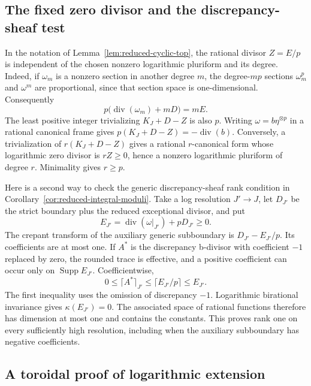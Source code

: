\subsection{The fixed zero divisor and the discrepancy-sheaf test}

In the notation of Lemma~\ref{lem:reduced-cyclic-top}, the rational
divisor $Z=E/p$ is independent of the chosen nonzero logarithmic
pluriform and its degree. Indeed, if $\omega_m$ is a nonzero section
in another degree $m$, the degree-$mp$ sections $\omega_m^p$ and
$\omega^m$ are proportional, since that section space is
one-dimensional. Consequently
\[
 p\bigl(\operatorname{div}(\omega_m)+mD\bigr)=mE.
\]
The least positive integer trivializing $K_J+D-Z$ is also $p$.
Writing $\omega=b\eta^{\otimes p}$ in a rational canonical frame
gives $p(K_J+D-Z)=-\operatorname{div}(b)$. Conversely, a
trivialization of $r(K_J+D-Z)$ gives a rational $r$-canonical form
whose logarithmic zero divisor is $rZ\ge0$, hence a nonzero
logarithmic pluriform of degree $r$. Minimality gives $r\ge p$.

Here is a second way to check the generic discrepancy-sheaf rank
condition in Corollary~\ref{cor:reduced-integral-moduli}. Take a log
resolution $J'\to J$, let $D_{J'}$ be the strict boundary plus the
reduced exceptional divisor, and put
\[
 E_{J'}=\operatorname{div}(\omega|_{J'})+pD_{J'}\ge0.
\]
The crepant transform of the auxiliary generic subboundary is
$D_{J'}-E_{J'}/p$. Its coefficients are at most one. If $A^*$ is
the discrepancy b-divisor with coefficient $-1$ replaced by zero,
the rounded trace is effective, and a positive coefficient can
occur only on $\operatorname{Supp}E_{J'}$. Coefficientwise,
\[
 0\le \lceil A^*\rceil_{J'}
   \le\lceil E_{J'}/p\rceil\le E_{J'}.
\]
The first inequality uses the omission of discrepancy $-1$.
Logarithmic birational invariance gives $\kappa(E_{J'})=0$.
The associated space of rational functions therefore has dimension
at most one and contains the constants. This proves rank one on
every sufficiently high resolution, including when the auxiliary
subboundary has negative coefficients.

\subsection{A toroidal proof of logarithmic extension}

